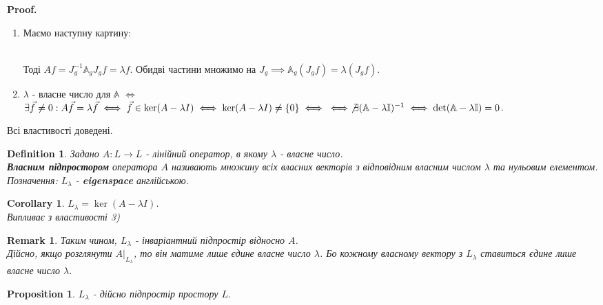 \documentclass[a4paper, 10pt]{article}
\makeatletter
\theoremstyle{theoremdd}
\newtheorem{definition}[theorem]{Definition}
\newtheorem{proposition}[theorem]{Proposition}
\newtheorem{remark}[theorem]{Remark}
\newtheorem{corollary}[theorem]{Corollary}
\renewenvironment{proof}[1][Proof.\\]{\par
\pushQED{\hfill \qed}%
\normalfont \topsep6\p@\@plus6\p@\relax
\trivlist
\item\relax
{\bfseries
#1\@addpunct{.}}\hspace\labelsep\ignorespaces
}{%
\popQED\endtrivlist\@endpefalse
}
\makeatother
\begin{document}
\begin{proof}
\begin{enumerate}[wide=0pt, label={\arabic*)},topsep=-\parskip]
\item Маємо наступну картину:\\
\\
Тоді $Af = J_g^{-1} \mathbb{A}_g J_g f = \lambda f$. Обидві частини множимо на $J_g \implies \mathbb{A}_g (J_g f) = \lambda (J_g f)$.

\item $\lambda$ - власне число для $\mathbb{A}$ $\iff$ $\exists \vec{f} \neq 0: A \vec{f} = \lambda \vec{f} \iff \vec{f} \in \ker (A-\lambda I) \iff \ker (A-\lambda I) \neq \{0\} \iff \\ \iff \not\exists (\mathbb{A} - \lambda \mathbb{I})^{-1} \iff \det (\mathbb{A} - \lambda \mathbb{I}) = 0$.
\end{enumerate}
Всі властивості доведені.
\end{proof}

\begin{definition}
Задано $A \colon L \to L$ - лінійний оператор, в якому $\lambda$ - власне число.\\
\textbf{Власним підпростором} оператора $A$ називають множину всіх власних векторів з відповідним власним числом $\lambda$ та нульовим елементом.\\
Позначення: $L_{\lambda}$ - \textbf{eigenspace} англійською.
\end{definition}

\begin{corollary}
$L_\lambda = \ker(A-\lambda I)$.\\
\textit{Випливає з властивості 3)}
\end{corollary}

\begin{remark}
Таким чином, $L_{\lambda}$ - інваріантний підпростір відносно $A$. \\
Дійсно, якщо розглянути $A|_{L_{\lambda}}$, то він матиме лише єдине власне число $\lambda$. Бо кожному власному вектору з $L_{\lambda}$ ставиться єдине лише власне число $\lambda$.
\end{remark}

\begin{proposition}
\label{eigenspace_is_subspace}
$L_{\lambda}$ - дійсно підпростір простору $L$.
\end{proposition}
\end{document}
